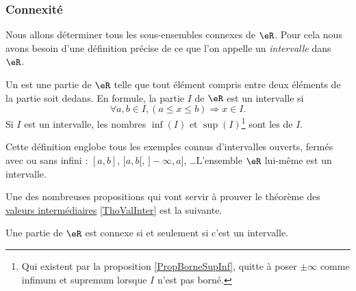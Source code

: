 \subsubsection{Connexité}

Nous allons déterminer tous les sous-ensembles connexes de $\eR$. Pour cela nous avons besoin d'une définition précise de ce que l'on appelle un \emph{intervalle} dans~$\eR$.
\begin{definition}  \label{DefEYAooMYYTz}
    Un  est une partie de $\eR$ telle que tout élément compris entre deux éléments de la partie soit dedans. En formule, la partie $I$ de $\eR$ est un intervalle si
    \[
      \forall a,b\in I,(a\leq x\leq b)\Rightarrow x\in I.
    \]
    Si \( I\) est un intervalle, les nombres \( \inf(I)\) et \( \sup(I)\)\footnote{Qui existent par la proposition \ref{PropBorneSupInf}, quitte à poser \( \pm\infty\) comme infimum et supremum lorsque \( I\) n'est pas borné.} sont les  de \( I\).
\end{definition}
Cette définition englobe tous les exemples connus d'intervalles ouverts, fermés avec ou sans infini : $[a,b]$, $[a,b[$, $]-\infty,a]$, \ldots L'ensemble \( \eR\) lui-même est un intervalle.

Une des nombreuses propositions qui vont servir à prouver le théorème des \href{http://fr.wikipedia.org/wiki/Théorème_des_valeurs_intermédiaires}{valeurs intermédiaires} \ref{ThoValInter} est la suivante.
\begin{proposition} \label{PropInterssiConn}
    Une partie de $\eR$ est connexe si et seulement si c'est un intervalle.
\end{proposition}

